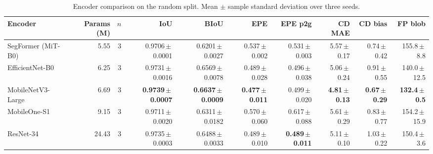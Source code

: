 \begin{table}[t]
\centering
\small
\caption{Encoder comparison on the random split. Mean $\pm$ sample standard deviation over three seeds.}
\label{tab:encoders}
\begin{tabular}{l r r r r r r r r r}
\toprule
Encoder & Params (M) & $n$ & IoU & BIoU & EPE & EPE p2g & CD MAE & CD bias & FP blob \\
\midrule
SegFormer (MiT-B0) & 5.55 & 3 & 0.9706\,$\pm$\,0.0001 & 0.6201\,$\pm$\,0.0027 & 0.537\,$\pm$\,0.002 & 0.531\,$\pm$\,0.003 & 5.57\,$\pm$\,0.17 & 0.74\,$\pm$\,0.42 & 155.8\,$\pm$\,8.8 \\
EfficientNet-B0 & 6.25 & 3 & 0.9731\,$\pm$\,0.0016 & 0.6569\,$\pm$\,0.0078 & 0.489\,$\pm$\,0.028 & 0.496\,$\pm$\,0.038 & 5.06\,$\pm$\,0.24 & 0.91\,$\pm$\,0.55 & 140.0\,$\pm$\,12.5 \\
MobileNetV3-Large & 6.69 & 3 & \textbf{0.9739\,$\pm$\,0.0007} & \textbf{0.6637\,$\pm$\,0.0009} & \textbf{0.477\,$\pm$\,0.011} & 0.499\,$\pm$\,0.020 & \textbf{4.81\,$\pm$\,0.13} & \textbf{0.67\,$\pm$\,0.29} & \textbf{132.4\,$\pm$\,0.5} \\
MobileOne-S1 & 9.15 & 3 & 0.9711\,$\pm$\,0.0020 & 0.6311\,$\pm$\,0.0182 & 0.570\,$\pm$\,0.060 & 0.617\,$\pm$\,0.088 & 5.61\,$\pm$\,0.29 & 0.83\,$\pm$\,0.77 & 154.2\,$\pm$\,15.9 \\
ResNet-34 & 24.43 & 3 & 0.9735\,$\pm$\,0.0003 & 0.6488\,$\pm$\,0.0033 & 0.489\,$\pm$\,0.010 & \textbf{0.489\,$\pm$\,0.011} & 5.11\,$\pm$\,0.10 & 1.03\,$\pm$\,0.22 & 150.4\,$\pm$\,3.6 \\
\bottomrule
\end{tabular}
\end{table}

